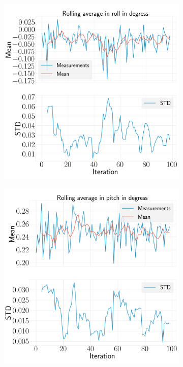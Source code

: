 \documentclass[../Head/report.tex]{subfiles}
\begin{document}
\begin{figure}[H]
    \centering
    \begin{subfigure}[t]{.30\textwidth}
        \centering
        \includegraphics[width=\textwidth]{../Figures/analyse_rolling_average/test2/Calculated_rolling_average_in_roll_with_mean_and_STD.png}
        \caption{}
        \label{fig:rolling_average_in_roll_test2}
    \end{subfigure}
     \hspace{0.2em}
    \begin{subfigure}[t]{.30\textwidth}
        \centering
        \includegraphics[width=\textwidth]{../Figures/analyse_rolling_average/test2/Calculated_rolling_average_in_pitch_with_mean_and_STD.png}

\end{subfigure}
\end{figure}
\end{document}
